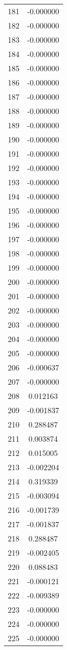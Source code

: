 \documentclass[12pt]{article}
\begin{document}
\begin{longtable}{@{}cc@{}}
181 & -0.000000 \\
182 & -0.000000 \\
183 & -0.000000 \\
184 & -0.000000 \\
185 & -0.000000 \\
186 & -0.000000 \\
187 & -0.000000 \\
188 & -0.000000 \\
189 & -0.000000 \\
190 & -0.000000 \\
191 & -0.000000 \\
192 & -0.000000 \\
193 & -0.000000 \\
194 & -0.000000 \\
195 & -0.000000 \\
196 & -0.000000 \\
197 & -0.000000 \\
198 & -0.000000 \\
199 & -0.000000 \\
200 & -0.000000 \\
201 & -0.000000 \\
202 & -0.000000 \\
203 & -0.000000 \\
204 & -0.000000 \\
205 & -0.000000 \\
206 & -0.000637 \\
207 & -0.000000 \\
208 & 0.012163 \\
209 & -0.001837 \\
210 & 0.288487 \\
211 & 0.003874 \\
212 & 0.015005 \\
213 & -0.002204 \\
214 & 0.319339 \\
215 & -0.003094 \\
216 & -0.001739 \\
217 & -0.001837 \\
218 & 0.288487 \\
219 & -0.002405 \\
220 & 0.088483 \\
221 & -0.000121 \\
222 & -0.009389 \\
223 & -0.000000 \\
224 & -0.000000 \\
225 & -0.000000 \\

\end{longtable}
\end{document}
